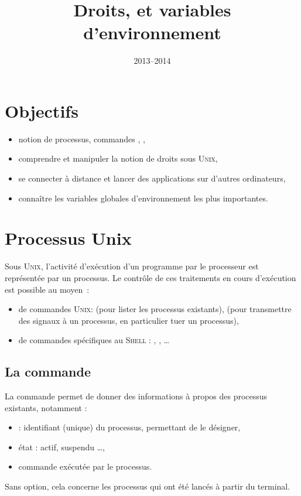 \documentclass[11pt,a4paper]{article}
\title{Droits, \cmd{ssh} et variables d'environnement}
\date{2013--2014}
\newcommand{\unix}{\textsc{Unix}}
\newcommand{\shell}{\textsc{Shell}}
\begin{document}
\maketitle

\section*{Objectifs}

\begin{itemize}
  \item notion de processus, commandes , ,
  \item comprendre et manipuler la notion de droits sous \textsc{Unix},
  \item se connecter à distance et lancer des applications sur d'autres
        ordinateurs,
  \item connaître les variables globales d'environnement les plus importantes.
\end{itemize}

\section{Processus Unix}

Sous \unix, l'activité d'exécution d'un programme par le processeur est
représentée par un processus. 
Le contrôle de ces traitements en cours d'exécution est possible au moyen~:

\begin{itemize}
  \item de commandes \unix :  (pour lister les processus existants),
         (pour transmettre des signaux à un processus, en
        particulier tuer un processus),
  \item de commandes spécifiques au \shell{} : , ,
         \ldots
\end{itemize}

\subsection{La commande }

La commande  permet de donner des informations à propos des processus 
existants, notamment : 
\begin{itemize}
  \item {} : identifiant (unique) du processus, permettant de le
        désigner, 
  \item état : actif, suspendu \ldots,
  \item commande exécutée par le processus.
\end{itemize}
Sans option, cela concerne les processus qui ont été lancés à partir du
terminal.
\end{document}

